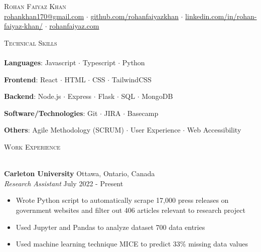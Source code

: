 \documentclass[a4paper]{article}
\newcommand{\lineunder} {
    \vspace*{-8pt} \\
    \hspace*{-18pt} \hrulefill \\
}
\newcommand{\header} [1] {
    {\hspace*{-18pt}\vspace*{6pt} \textsc{#1}}
    \vspace*{-6pt} \lineunder
}
\begin{document}
\vspace*{-40pt}

    

\vspace*{-10pt}
\begin{center}
	{\Huge \scshape {Rohan Faiyaz Khan}}\\
	\href{mailto:rohankhan170@gmail.com}{rohankhan170@gmail.com} $\cdot$ \href{https://www.github.com/rohanfaiyazkhan}{github.com/rohanfaiyazkhan} $\cdot$ \href{https://linkedin.com/in/rohan-faiyaz-khan/}{linkedin.com/in/rohan-faiyaz-khan/} $\cdot$  \href{https://rohanfaiyaz.com}{rohanfaiyaz.com} \\
\end{center}

\header{Technical Skills}

\textbf{Languages}: Javascript $\cdot$ Typescript $\cdot$ Python

\textbf{Frontend}: React $\cdot$ HTML $\cdot$ CSS $\cdot$ TailwindCSS

\textbf{Backend}: Node.js $\cdot$ Express $\cdot$ Flask $\cdot$ SQL $\cdot$ MongoDB

\textbf{Software/Technologies}: Git $\cdot$ JIRA $\cdot$ Basecamp

\textbf{Others}: Agile Methodology (SCRUM) $\cdot$ User Experience $\cdot$ Web Accessibility

\vspace{2mm}

\header{Work Experience}
\vspace{1mm}

\textbf{Carleton University} \hfill Ottawa, Ontario, Canada\\
\textit{Research Assistant} \hfill July 2022 - Present\\
\vspace{-1mm}
\begin{itemize} \itemsep 1pt
	\item Wrote Python script to automatically scrape 17,000 press releases on government websites and filter out 406 articles relevant to research project
	\item Used Jupyter and Pandas to analyze dataset 700 data entries
	\item Used machine learning technique MICE to predict 33\% missing data values 
\end{itemize}
\end{document}
